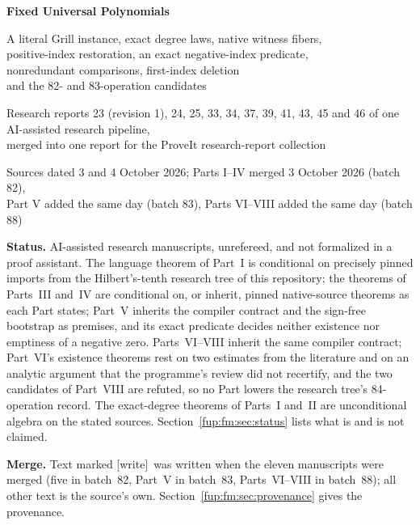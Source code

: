 \documentclass[11pt,letterpaper]{article}
\theoremstyle{definition}\newtheorem{definition}[theorem]{Definition}
\theoremstyle{remark}\newtheorem{remark}[theorem]{Remark}
\newcommand{\wtag}{\textup{[write]}}
\begin{document}
\hypersetup{pageanchor=false}
\begin{titlepage}
\centering
\vspace*{2.2cm}
{\LARGE\bfseries Fixed Universal Polynomials\par}
\vspace{0.6cm}
{\large A literal Grill instance, exact degree laws, native witness fibers,\\ positive-index restoration, an exact negative-index predicate,\\ nonredundant comparisons, first-index deletion\\ and the 82- and 83-operation candidates\par}
\vspace{1.2cm}
{\normalsize Research reports 23 (revision 1), 24, 25, 33, 34, 37, 39, 41, 43, 45 and 46 of one AI-assisted research pipeline,\\ merged into one report for the ProveIt research-report collection\par}
\vspace{0.8cm}
{\normalsize Sources dated 3 and 4 October 2026; Parts I--IV merged 3 October 2026 (batch 82),\\ Part V added the same day (batch 83), Parts VI--VIII added the same day (batch 88)\par}
\vspace{1.4cm}
\begin{minipage}{0.86\textwidth}\small
\textbf{Status.} AI-assisted research manuscripts, unrefereed, and not formalized in a proof assistant. The language theorem of Part~I is conditional on precisely pinned imports from the Hilbert's-tenth research tree of this repository; the theorems of Parts~III and~IV are conditional on, or inherit, pinned native-source theorems as each Part states; Part~V inherits the compiler contract and the sign-free bootstrap as premises, and its exact predicate decides neither existence nor emptiness of a negative zero. Parts~VI--VIII inherit the same compiler contract; Part~VI's existence theorems rest on two estimates from the literature and on an analytic argument that the programme's review did not recertify, and the two candidates of Part~VIII are refuted, so no Part lowers the research tree's 84-operation record. The exact-degree theorems of Parts~I and~II are unconditional algebra on the stated sources. Section~\ref{fup:fm:sec:status} lists what is and is not claimed.

\medskip
\textbf{Merge.} Text marked \wtag\ was written when the eleven manuscripts were merged (five in batch~82, Part~V in batch~83, Parts~VI--VIII in batch~88); all other text is the source's own. Section~\ref{fup:fm:sec:provenance} gives the provenance.
\end{minipage}
\vfill
\end{titlepage}
\hypersetup{pageanchor=true}
\setcounter{page}{1}
\tableofcontents
\newpage
\end{document}
